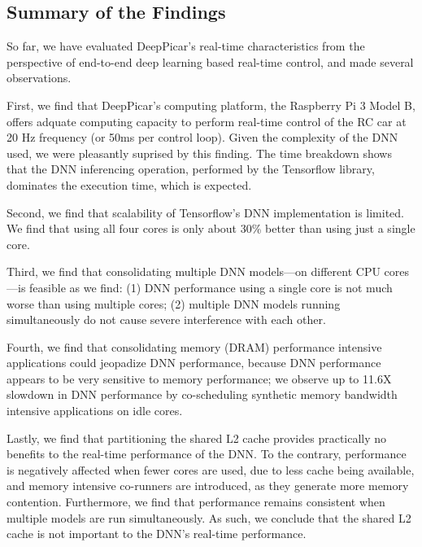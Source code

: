 \subsection{Summary of the Findings}
So far, we have evaluated DeepPicar's real-time
characteristics from the perspective of end-to-end deep learning based
real-time control, and made several observations.

First, we find that DeepPicar's computing platform,
the Raspberry Pi 3 Model B, offers adquate computing capacity to
perform real-time control of the RC car at 20 Hz frequency (or
50ms per control loop). Given the complexity of the DNN used, we
were pleasantly suprised by this finding. The time breakdown shows that
the DNN inferencing operation, performed by the Tensorflow library,
dominates the execution time, which is expected.

Second, we find that scalability of Tensorflow's DNN 
implementation is limited. We find that using all four cores is 
only about 30\% better than using just a single core.

Third, we find that consolidating multiple DNN models---on different CPU
cores---is feasible as we find: (1) DNN performance using a single
core is not much worse than using multiple cores; (2) multiple DNN
models running simultaneously do not cause severe interference with
each other.

Fourth, we find that consolidating memory (DRAM) performance
intensive applications could jeopadize DNN performance, because DNN
performance appears to be very sensitive to memory performance; we 
observe up to 11.6X slowdown in DNN performance by co-scheduling 
synthetic memory bandwidth intensive applications on idle cores.

Lastly, we find that partitioning the shared L2 cache provides 
practically no benefits to the real-time performance of the DNN. To the 
contrary, performance is negatively affected when fewer cores are used, 
due to less cache being available, and memory intensive co-runners are 
introduced, as they generate more memory contention. Furthermore, we 
find that performance remains consistent when multiple models are run 
simultaneously. As such, we conclude that the shared L2 cache is not 
important to the DNN's real-time performance.